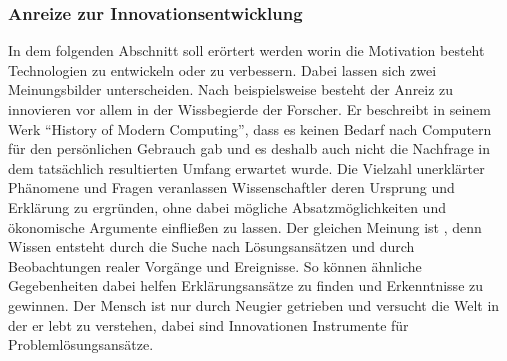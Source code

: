 \subsubsection*{Anreize zur Innovationsentwicklung}\label{sec:Anreize}
%
In dem folgenden Abschnitt soll erörtert werden worin die Motivation besteht Technologien zu entwickeln oder zu verbessern. Dabei lassen sich zwei Meinungsbilder unterscheiden.  Nach \cite{Ceruzzi.2003} beispielsweise besteht der Anreiz zu innovieren vor allem in der Wissbegierde der Forscher. Er beschreibt in seinem Werk "`History of Modern Computing"', dass es keinen Bedarf nach Computern für den persönlichen Gebrauch gab und es deshalb auch nicht die Nachfrage in dem tatsächlich resultierten Umfang erwartet wurde. Die Vielzahl unerklärter Phänomene und Fragen veranlassen Wissenschaftler deren Ursprung und Erklärung zu ergründen, ohne dabei mögliche Absatzmöglichkeiten und ökonomische Argumente einfließen zu lassen. Der gleichen Meinung ist \cite[S.30]{Arrow.1969}, denn Wissen entsteht durch die Suche nach Lösungsansätzen und durch Beobachtungen realer Vorgänge und Ereignisse. So können ähnliche Gegebenheiten dabei helfen Erklärungsansätze zu finden und Erkenntnisse zu gewinnen. Der Mensch ist nur durch Neugier getrieben und versucht die Welt in der er lebt zu verstehen, dabei sind Innovationen Instrumente für Problemlösungsansätze. \\
%
